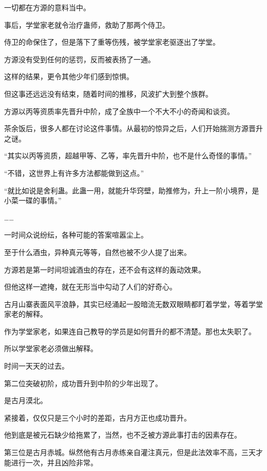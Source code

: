 
\begin{this_body}



一切都在方源的意料当中。

事后，学堂家老就令治疗蛊师，救助了那两个侍卫。

侍卫的命保住了，但是落下了重等伤残，被学堂家老驱逐出了学堂。

方源没有受到任何的惩罚，反而被表扬了一通。

这样的结果，更令其他少年们感到惊惧。

但这事还远远没有结束，随着时间的推移，风波扩大到整个族群。

方源以丙等资质率先晋升中阶，成了全族中一个不大不小的奇闻和谈资。

茶余饭后，很多人都在讨论这件事情。从最初的惊异之后，人们开始揣测方源晋升之谜。

“其实以丙等资质，超越甲等、乙等，率先晋升中阶，也不是什么奇怪的事情。”

“不错，这世界上有许多方法都能做到这点。”

“就比如说是舍利蛊。此蛊一用，就能升华窍壁，助推修为，升上一阶小境界，是小菜一碟的事情。”

……

一时间众说纷纭，各种可能的答案喧嚣尘上。

至于什么酒虫，异种真元等等，自然也被不少人提了出来。

方源若是第一时间坦诚酒虫的存在，还不会有这样的轰动效果。

但他这样一遮掩，就在无形当中勾动了人们的好奇心。

古月山寨表面风平浪静，其实已经涌起一股暗流无数双眼睛都盯着学堂，等着学堂家老的解释。

作为学堂家老，如果连自己教导的学员是如何晋升的都不清楚。那也太失职了。

所以学堂家老必须做出解释。

时间一天天的过去。

第二位突破初阶，成功晋升到中阶的少年出现了。

是古月漠北。

紧接着，仅仅只是三个小时的差距，古月方正也成功晋升。

他到底是被元石缺少给拖累了，当然，也不乏被方源此事打击的因素存在。

第三位是古月赤城。纵然他有古月赤练亲自灌注真元，但是此法效率不高，三天才能进行一次，并且凶险非常。


\end{this_body}
